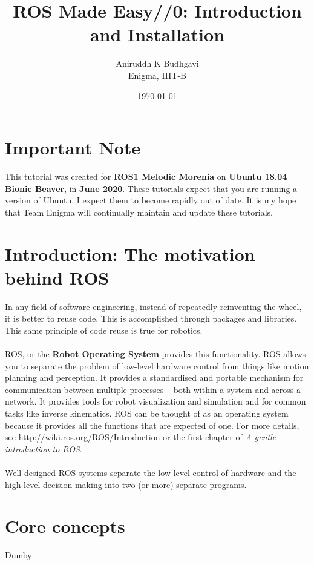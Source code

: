 \documentclass{article}
\title{ROS Made Easy//0: Introduction and Installation}
\date{\today}
\author{Aniruddh K Budhgavi \\Enigma, IIIT-B}
\begin{document}
    \maketitle
    \section{Important Note}
    This tutorial was created for \textbf{ROS1 Melodic Morenia}
    on \textbf{Ubuntu 18.04 Bionic Beaver}, in \textbf{June 2020}. These
    tutorials expect that you are running a version of Ubuntu.
    I expect them to become rapidly out of date. It is my hope
    that Team Enigma will continually maintain and update these tutorials.
    \section{Introduction: The motivation behind ROS}
    In any field of software engineering, instead
    of repeatedly reinventing the wheel, it is better to
    reuse code. This is accomplished through packages and libraries.
    This same principle of code reuse is true for robotics.
    \\
    \\
    ROS, or the \textbf{Robot Operating System} provides this
    functionality. ROS allows you to separate the problem of
    low-level hardware control from things like motion planning and
    perception. It provides a standardised and portable mechanism for communication
    between multiple processes -- both within a system and across a network.
    It provides tools for robot visualization and simulation
    and for common tasks like inverse kinematics. ROS can be thought
    of as an operating system because it provides all the functions
    that are expected of one. For more details, see \url{http://wiki.ros.org/ROS/Introduction}
    or the first chapter of \emph{A gentle introduction to ROS}.
    \\
    \\
    Well-designed ROS systems separate the low-level control of
    hardware and the high-level decision-making into 
    two (or more) separate programs.
    \section{Core concepts}
    Dumby
\end{document}

